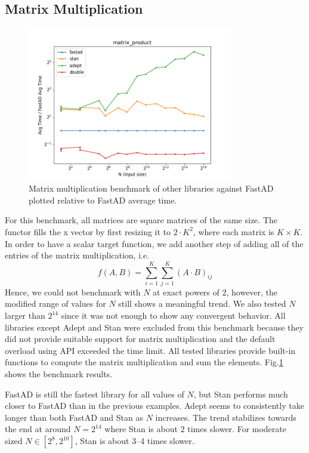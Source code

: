 \subsection{Matrix Multiplication}\label{ssec:matrix_mult}

\begin{figure}[t]
    \centering
    \includegraphics[width=0.8\textwidth]{figs/matrix_product_fig.png}
    \caption{%
        Matrix multiplication benchmark of other libraries against FastAD 
        plotted relative to FastAD average time.
    }\label{fig:matrix_mult}
\end{figure}

For this benchmark, all matrices are square matrices of the same size.
The functor fills the x vector by first resizing it to $2 \cdot K^2$,
where each matrix is $K\times K$.
In order to have a scalar target function,
we add another step of adding all of the entries of the matrix multiplication, i.e.
\[
    f(A, B) = \sum\limits_{i=1}^{K} \sum\limits_{j=1}^{K} {(A \cdot B)}_{ij}
\]
Hence, we could not benchmark with $N$ at exact powers of $ 2$,
however, the modified range of values for $N$ still shows a meaningful trend.
We also tested $N$ larger than $2^{14}$ since it was not enough to show any convergent behavior.
All libraries except Adept and Stan were excluded from this benchmark
because they did not provide suitable support for matrix multiplication
and the default overload using  API exceeded the time limit.
All tested libraries provide built-in functions to 
compute the matrix multiplication and sum the elements.
Fig.\ref{fig:matrix_mult} shows the benchmark results.

FastAD is still the fastest library for all values of $N$, 
but Stan performs much closer to FastAD than in the previous examples.
Adept seems to consistently take longer than both FastAD and Stan as $N$ increases.
The trend stabilizes towards the end at around $N=2^{14}$ where 
Stan is about $ 2$ times slower.
For moderate sized $N \in [2^{8}, 2^{10}]$, Stan is about 3--4 times slower.

